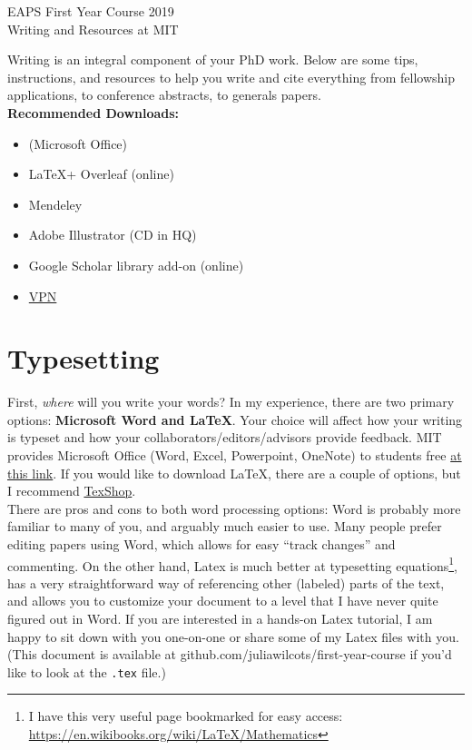 \documentclass{article}
\begin{document}
\begin{center}
{\LARGE EAPS First Year Course 2019}\\
\vspace{10pt}
{\Large Writing and Resources at MIT}\\
\vspace{6pt}
\end{center}
Writing is an integral component of your PhD work. Below are some tips, instructions, and resources to help you write and cite everything from fellowship applications, to conference abstracts, to generals papers.\\

    \textbf{Recommended Downloads:}
    \begin{itemize}
        \item (Microsoft Office)
        \item \LaTeX + Overleaf (online)
        \item Mendeley
        \item Adobe Illustrator (CD in HQ)
        \item Google Scholar library add-on (online)
        \item \href{https://ist.mit.edu/cisco-anyconnect}{VPN}
    \end{itemize}

\section*{Typesetting}
First, \emph{where} will you write your words? In my experience, there are two primary options:
\textbf{Microsoft Word and \LaTeX}.
Your choice will affect how your writing is typeset and how your collaborators/editors/advisors provide feedback. MIT provides Microsoft Office (Word, Excel, Powerpoint, OneNote) to students free \href{https://ist.mit.edu/office/license}{at this link}. If you would like to download \LaTeX, there are a couple of options, but I recommend \href{https://pages.uoregon.edu/koch/texshop/}{TexShop}.\\

There are pros and cons to both word processing options: Word is probably more familiar to many of you, and arguably much easier to use. Many people prefer editing papers using Word, which allows for easy ``track changes'' and commenting. On the other hand, Latex is much better at typesetting equations\footnote{I have this very useful page bookmarked for easy access: \href{ https://en.wikibooks.org/wiki/LaTeX/Mathematics}{https://en.wikibooks.org/wiki/LaTeX/Mathematics}}, has a very straightforward way of referencing other (labeled) parts of the text, and allows you to customize your document to a level that I have never quite figured out in Word. If you are interested in a hands-on Latex tutorial, I am happy to sit down with you one-on-one or share some of my Latex files with you. (This document is available at github.com/juliawilcots/first-year-course if you'd like to look at the \texttt{.tex} file.)
\end{document}
